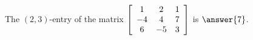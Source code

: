 \documentclass{ximera}
\author{Zack Reed}
\begin{document}
  
\begin{exercise}
  The $(2,3)$-entry of the matrix $\startmat{ccc}
    1 & 2 & 1 \\
    -4 & 4 & 7 \\
    6 & -5 & 3
  \stopmat$ is $\answer{7}$.
  
\end{exercise}
\end{document}
